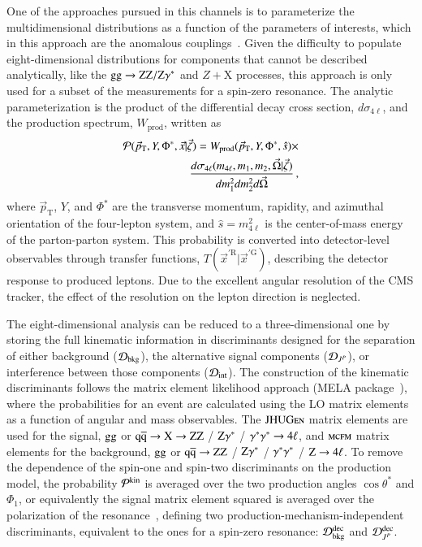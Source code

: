 One of the approaches pursued in this channels is to parameterize the
multidimensional distributions as a function of the parameters of
interests, which in this approach are the anomalous
couplings~\cite{Chen:2014pia}. Given the difficulty to populate
eight-dimensional distributions for components that cannot be
described analytically, like the $\mathrm{g}\mathrm{g}\to\mathrm{Z}\mathrm{Z}/\mathrm{Z}\gamma^*$ and $Z+$X
processes, this approach is only used for a subset of the measurements
for a spin-zero resonance.  The analytic parameterization is the
product of the differential decay cross section, $d\sigma_{4\ell}$,
and the production spectrum, $W_{\mathrm{prod}}$, written as
%
\begin{eqnarray}
\label{eqn:gen_pdf}
{\cal P}(\vec{p}_\mathrm{T},Y,\Phi^*, \vec{x} | \vec{\zeta}) =
W_{\mathrm{prod}}(\vec{p}_\mathrm{T},Y,\Phi^*,\hat{s}) \times \\ \nonumber
\frac{d\sigma_{4\ell}(m_{4\ell},m_1, m_2, \vec\Omega | \vec{\zeta})}{dm_1^2dm_2^2d\vec\Omega}\,, 
\end{eqnarray}
%
where $\vec{p}_\mathrm{T}$, $Y$, and $\Phi^*$ are the transverse
momentum, rapidity, and azimuthal orientation of the four-lepton
system, and $\hat{s}=m_{4\ell}^2$ is the center-of-mass energy of the
parton-parton system. This probability is converted into
detector-level observables through transfer functions,
$T({\vec{x}^{\prime\mathrm{R}}} | \vec{x}^{\prime\mathrm{G}})$,
describing the detector response to produced leptons. Due to the
excellent angular resolution of the CMS tracker, the effect of the
resolution on the lepton direction is neglected.


The eight-dimensional analysis can be reduced to a three-dimensional
one by storing the full kinematic information in discriminants
designed for the separation of either background (${\cal D}_{\rm
  bkg}$), the alternative signal components (${\cal D}_{J^P}$), or
interference between those components (${\cal D}_{\rm int}$).  The
construction of the kinematic discriminants follows the matrix element
likelihood approach ({\sc MELA}
package~\cite{Chatrchyan:2012ufa,Gao:2010qx}), where the probabilities
for an event are calculated using the LO matrix elements as a function
of angular and mass observables.  The $\textsc{JHUGen}$ matrix elements are
used for the signal, $\mathrm{g}\mathrm{g}$ or $\mathrm{\mathrm{q}\mathrm{\overline{q}}}\to \mathrm{X}\to \mathrm{Z}\mathrm{Z}$ / $\mathrm{Z}\gamma^*$
/ $\gamma^*\gamma^*\to4\ell$, and $\textsc{mcfm}$ matrix elements for the background,
$\mathrm{g}\mathrm{g}$ or $\mathrm{\mathrm{q}\mathrm{\overline{q}}}\to\mathrm{Z}\mathrm{Z}$ / $\mathrm{Z}\gamma^*$ / $\gamma^*\gamma^*$ / $\mathrm{Z}\to
4\ell$.
%
To remove the dependence of the spin-one and spin-two discriminants on
the production model, the probability ${\cal P}^{\rm kin}$ is averaged
over the two production angles $\cos\theta^*$ and $\Phi_1$, or
equivalently the signal matrix element squared is averaged over the
polarization of the resonance~\cite{Anderson:2013afp}, defining two
production-mechanism-independent discriminants, equivalent to the ones
for a spin-zero resonance: ${\cal D}^{\rm dec}_{\rm bkg}$ and ${\cal
  D}^{\rm dec}_{J^P}$.


